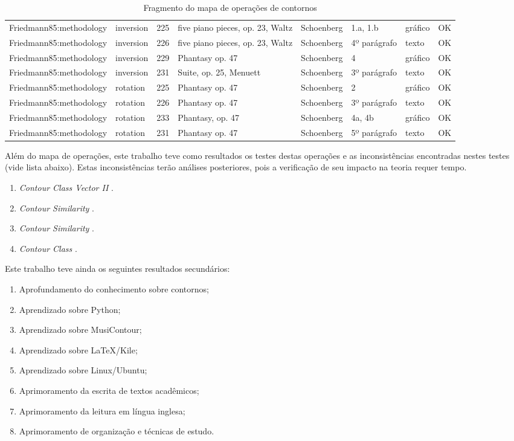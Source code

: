 \documentclass[11pt]{article}
\newcommand{\eng}[1]{\textit{#1}}
\begin{document}
\begin{table}
\begin{tabular}{r|lllllll}
    Friedmann85:methodology&inversion&225&five piano pieces, op. 23, Waltz&Schoenberg&1.a, 1.b&gráfico&OK\\
    Friedmann85:methodology&inversion&226&five piano pieces, op. 23, Waltz&Schoenberg&4º parágrafo&texto&OK\\
    Friedmann85:methodology&inversion&229&Phantasy op. 47&Schoenberg&4&gráfico&OK\\
    Friedmann85:methodology&inversion&231&Suite, op. 25, Menuett&Schoenberg&3º parágrafo&texto&OK\\
    Friedmann85:methodology&rotation&225&Phantasy op. 47&Schoenberg&2&gráfico&OK\\
    Friedmann85:methodology&rotation&226&Phantasy op. 47&Schoenberg&3º parágrafo&texto&OK\\
    Friedmann85:methodology&rotation&233&Phantasy, op. 47&Schoenberg&4a, 4b&gráfico&OK\\
    Friedmann85:methodology&rotation&231&Phantasy op. 47&Schoenberg&5º parágrafo&texto&OK\\
  \end{tabular}
  \caption{Fragmento do mapa de operações de contornos}
  \label{tab:mapa-operacoes}
\end{table}

Além do mapa de operações, este trabalho teve como resultados os
testes destas operações e as inconsistências encontradas nestes testes
(vide lista abaixo). Estas inconsistências terão análises posteriores,
pois a verificação de seu impacto na teoria requer tempo.

\begin{enumerate}
\item \eng{Contour Class Vector II} \cite[p. 241]{Friedmann1985}.
\item \eng{Contour Similarity} \cite[p. 242]{Quinn1997}.
\item \eng{Contour Similarity} \cite[p. 262]{Quinn1997}.
\item \eng{Contour Class} \cite[p. 113]{Schultz2008}.
\end{enumerate}

Este trabalho teve ainda os seguintes resultados secundários:

\begin{enumerate}
\item Aprofundamento do conhecimento sobre contornos;
\item Aprendizado sobre Python;
\item Aprendizado sobre MusiContour;
\item Aprendizado sobre \LaTeX/Kile;
\item Aprendizado sobre Linux/Ubuntu;
\item Aprimoramento da escrita de textos acadêmicos;
\item Aprimoramento da leitura em língua inglesa;
\item Aprimoramento de organização e técnicas de estudo.
\end{enumerate}
\end{document}
